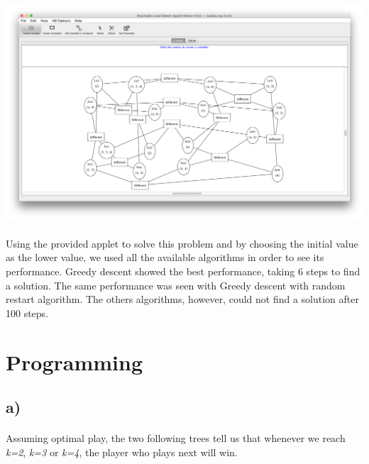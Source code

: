 \documentclass{article}
\begin{document}
\includegraphics[width=\textwidth]{sudoku}

\paragraph{} Using the provided applet to solve this problem and by choosing the initial value as the lower value, we used all the available algorithms in order to see its performance. Greedy descent showed the best performance, taking 6 steps to find a solution. The same performance was seen with Greedy descent with random restart algorithm. The others algorithms, however, could not find a solution after 100 steps.

\section*{Programming} 
\subsection*{a)}
\paragraph{} Assuming optimal play, the two following trees tell us that whenever we reach \textit{k=2}, \textit{k=3} or \textit{k=4}, the player who plays next will win.
\end{document}
